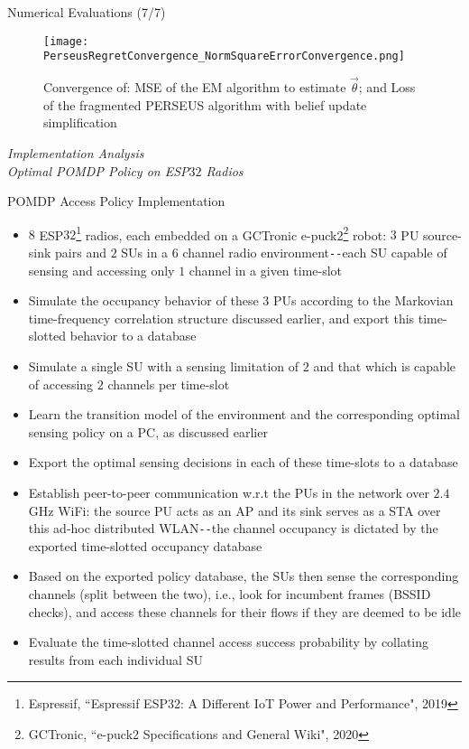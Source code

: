 \documentclass{beamer}
\begin{document}
\begin{frame}{Numerical Evaluations (7/7)}
    \begin{figure}
    \centering
    \texttt{[image: PerseusRegretConvergence\_NormSquareErrorConvergence.png]}
    \caption{Convergence of: MSE of the EM algorithm to estimate $\vec{\theta}$; and Loss of the fragmented PERSEUS algorithm with belief update simplification}
    \label{fig:35}
\end{figure}
\end{frame}
\begin{frame}{}
  \centering \Huge
  \emph{Implementation Analysis\\
        \LARGE{Optimal POMDP Policy on ESP$32$ Radios}}
\end{frame}
\begin{frame}{POMDP Access Policy Implementation}
    \scriptsize{\begin{itemize}
        \item $8$ ESP$32$\footnote{\tiny{Espressif, ``Espressif ESP32: A Different IoT Power and Performance", 2019}} radios, each embedded on a GCTronic e-puck2\footnote{\tiny{GCTronic, ``e-puck2 Specifications and General Wiki", 2020}} robot: $3$ PU source-sink pairs and $2$ SUs in a $6$ channel radio environment\texttt{-{}-}each SU capable of sensing and accessing only $1$ channel in a given time-slot
        \item Simulate the occupancy behavior of these $3$ PUs according to the Markovian time-frequency correlation structure discussed earlier, and export this time-slotted behavior to a database
        \item Simulate a single SU with a sensing limitation of $2$ and that which is capable of accessing $2$ channels per time-slot
        \item Learn the transition model of the environment and the corresponding optimal sensing policy on a PC, as discussed earlier
        \item Export the optimal sensing decisions in each of these time-slots to a database
        \item Establish peer-to-peer communication w.r.t the PUs in the network over $2.4$GHz WiFi: the source PU acts as an AP and its sink serves as a STA over this ad-hoc distributed WLAN\texttt{-{}-}the channel occupancy is dictated by the exported time-slotted occupancy database
        \item Based on the exported policy database, the SUs then sense the corresponding channels (split between the two), i.e., look for incumbent frames (BSSID checks), and access these channels for their flows if they are deemed to be idle
        \item Evaluate the time-slotted channel access success probability by collating results from each individual SU
    \end{itemize}}
\end{frame}
\end{document}
